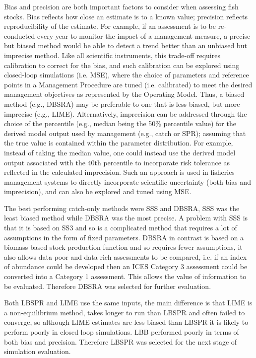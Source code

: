 Bias and precision are both important factors to consider when assessing fish stocks. Bias reflects how close an estimate is to a known value; precision reflects reproducibility of the estimate. For example, if an assessment is to be re-conducted every year to monitor the impact of a management measure, a precise but biased method would be able to detect a trend better than an unbiased but imprecise method. Like all scientific instruments, this trade-off requires calibration to correct for the bias, and such calibration can be explored using closed-loop simulations (i.e. MSE), where the choice of parameters and reference points in a Management Procedure are tuned (i.e. calibrated) to meet the desired management objectives as represented by the Operating Model. Thus, a biased method (e.g., DBSRA) may be preferable to one that is less biased, but more imprecise (e.g., LIME). Alternatively, imprecision can be addressed through the choice of the percentile (e.g., median being the 50\% percentile value) for the derived model output used by management (e.g., catch or SPR); assuming that the true value is contained within the parameter distribution. For example, instead of taking the median value, one could instead use the derived model output associated with the 40th percentile to incorporate risk tolerance as reflected in the calculated imprecision. Such an approach \citep{Ralston2011meta} is used in fisheries management systems to directly incorporate scientific uncertainty (both bias and imprecision), and can also be explored and tuned using MSE.

The best performing catch-only methods were SSS and DBSRA, SSS was the least biased method while DBSRA was the most precise. A problem with SSS is that it is based on SS3 and so is a complicated method that requires a lot of assumptions in the form of fixed parameters. DBSRA in contrast is based on a biomass based stock production function and so requires fewer assumptions, it also allows data poor and data rich assessments to be compared, i.e. if an index of abundance could be developed then an ICES Category 3 assessment could be converted into a Category 1 assessment. This allows the value of information to be evaluated. Therefore DBSRA was selected for further evaluation.  

Both LBSPR and LIME use the same inputs, the main difference is that LIME is a non-equilibrium method, takes longer to run than LBSPR and often failed to converge, so although LIME estimates are less biased than LBSPR it is likely to perform poorly in closed loop simulations. LBB performed poorly in terms of both bias and precision. Therefore LBSPR was selected for the next stage of simulation evaluation.

